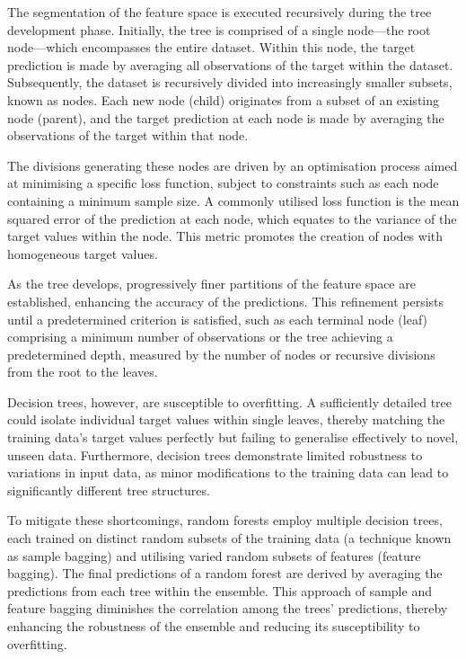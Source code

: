 The segmentation of the feature space is executed recursively during the tree development phase. Initially, the tree is comprised of a single node—the root node—which encompasses the entire dataset. Within this node, the target prediction is made by averaging all observations of the target within the dataset. Subsequently, the dataset is recursively divided into increasingly smaller subsets, known as nodes. Each new node (child) originates from a subset of an existing node (parent), and the target prediction at each node is made by averaging the observations of the target within that node.

The divisions generating these nodes are driven by an optimisation process aimed at minimising a specific loss function, subject to constraints such as each node containing a minimum sample size. A commonly utilised loss function is the mean squared error of the prediction at each node, which equates to the variance of the target values within the node. This metric promotes the creation of nodes with homogeneous target values.

As the tree develops, progressively finer partitions of the feature space are established, enhancing the accuracy of the predictions. This refinement persists until a predetermined criterion is satisfied, such as each terminal node (leaf) comprising a minimum number of observations or the tree achieving a predetermined depth, measured by the number of nodes or recursive divisions from the root to the leaves.

Decision trees, however, are susceptible to overfitting. A sufficiently detailed tree could isolate individual target values within single leaves, thereby matching the training data's target values perfectly but failing to generalise effectively to novel, unseen data. Furthermore, decision trees demonstrate limited robustness to variations in input data, as minor modifications to the training data can lead to significantly different tree structures.

To mitigate these shortcomings, random forests employ multiple decision trees, each trained on distinct random subsets of the training data (a technique known as sample bagging) and utilising varied random subsets of features (feature bagging). The final predictions of a random forest are derived by averaging the predictions from each tree within the ensemble. This approach of sample and feature bagging diminishes the correlation among the trees' predictions, thereby enhancing the robustness of the ensemble and reducing its susceptibility to overfitting.

